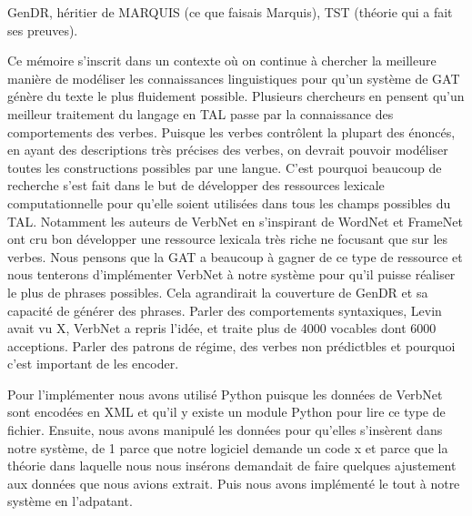 GenDR, héritier de MARQUIS (ce que faisais Marquis), TST (théorie qui a fait ses preuves).

Ce mémoire s'inscrit dans un contexte où on continue à chercher la meilleure manière de modéliser les connaissances linguistiques pour qu'un système de \ac{GAT} génère du texte le plus fluidement possible. Plusieurs chercheurs en pensent qu'un meilleur traitement du langage en \ac{TAL} passe par la connaissance des comportements des verbes. Puisque les verbes contrôlent la plupart des énoncés, en ayant des descriptions très précises des verbes, on devrait pouvoir modéliser toutes les constructions possibles par une langue. C'est pourquoi beaucoup de recherche s'est fait dans le but de développer des ressources lexicale computationnelle pour qu'elle soient utilisées dans tous les champs possibles du \ac{TAL}. Notamment les auteurs de VerbNet en s'inspirant de WordNet et FrameNet ont cru bon développer une ressource lexicala très riche ne focusant que sur les verbes. Nous pensons que la \ac{GAT} a beaucoup à gagner de ce type de ressource et nous tenterons d'implémenter VerbNet à notre système pour qu'il puisse réaliser le plus de phrases possibles. Cela agrandirait la couverture de GenDR et sa capacité de générer des phrases. Parler des comportements syntaxiques, Levin avait vu X, VerbNet a repris l'idée, et traite plus de 4000 vocables dont 6000 acceptions. Parler des patrons de régime, des verbes non prédictbles et pourquoi c'est important de les encoder.

Pour l'implémenter nous avons utilisé Python puisque les données de VerbNet sont encodées en XML et qu'il y existe un module Python pour lire ce type de fichier. Ensuite, nous avons manipulé les données pour qu'elles s'insèrent dans notre système, de 1 parce que notre logiciel demande un code x et parce que la théorie dans laquelle nous nous insérons demandait de faire quelques ajustement aux données que nous avions extrait. Puis nous avons implémenté le tout à notre système en l'adpatant.

